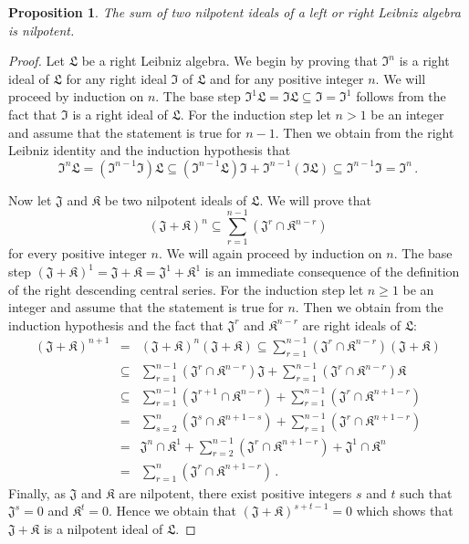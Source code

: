 \documentclass{amsart}
\newtheorem{pro}[thm]{Proposition}
\numberwithin{equation}{section}
\newcommand{\lf}{\mathfrak{L}}
\newcommand{\If}{\mathfrak{I}}
\newcommand{\jf}{\mathfrak{J}}
\newcommand{\kf}{\mathfrak{K}}
\begin{document}
\begin{pro}\label{sumidnilp}
The sum of two nilpotent ideals of a left or right Leibniz algebra is nilpotent.
\end{pro}

\begin{proof}
Let $\lf$ be a right Leibniz algebra. We begin by proving that $\If^n$ is a right ideal of $\lf$ for
any right ideal $\If$ of $\lf$ and for any positive integer $n$. We will proceed by induction on
$n$. The base step $\If^1\lf=\If\lf\subseteq\If=\If^1$ follows from the fact that $\If$ is a
right ideal of $\lf$. For the induction step let $n>1$ be an integer and assume that the statement
is true for $n-1$. Then we obtain from the right Leibniz identity and the induction hypothesis that
$$\If^n\lf=(\If^{n-1}\If)\lf\subseteq(\If^{n-1}\lf)\If+\If^{n-1}(\If\lf)\subseteq\If^{n-1}\If=
\If^n\,.$$

Now let $\jf$ and $\kf$ be two nilpotent ideals of $\lf$. We will prove that $$(\jf+\kf)^n\subseteq
\sum_{r=1}^{n-1}(\jf^r\cap\kf^{n-r})$$ for every positive integer $n$. We will again proceed by
induction on $n$. The base step $(\jf+\kf)^1=\jf+\kf=\jf^1+\kf^1$ is an immediate consequence
of the definition of the right descending central series. For the induction step let $n\ge 1$ be an integer
and assume that the statement is true for $n$. Then we obtain from the induction hypothesis and
the fact that $\jf^r$ and $\kf^{n-r}$ are right ideals of $\lf$:
\begin{eqnarray*}
(\jf+\kf)^{n+1} & = & (\jf+\kf)^n(\jf+\kf)\subseteq\sum_{r=1}^{n-1}(\jf^r\cap\kf^{n-r})(\jf+\kf)\\
& \subseteq & \sum_{r=1}^{n-1}(\jf^r\cap\kf^{n-r})\jf+\sum_{r=1}^{n-1}(\jf^r\cap\kf^{n-r})\kf\\
& \subseteq & \sum_{r=1}^{n-1}(\jf^{r+1}\cap\kf^{n-r})+\sum_{r=1}^{n-1}(\jf^r\cap\kf^{n+1-r})\\
& = & \sum_{s=2}^n(\jf^s\cap\kf^{n+1-s})+\sum_{r=1}^{n-1}(\jf^r\cap\kf^{n+1-r})\\
& = & \jf^n\cap\kf^1+\sum_{r=2}^{n-1}(\jf^r\cap\kf^{n+1-r})+\jf^1\cap\kf^n\\
& = & \sum_{r=1}^n(\jf^r\cap\kf^{n+1-r})\,.
\end{eqnarray*}
Finally, as $\jf$ and $\kf$ are nilpotent, there exist positive integers $s$ and $t$ such that $\jf^s
=0$ and $\kf^t=0$. Hence we obtain that $(\jf+\kf)^{s+t-1}=0$ which shows that $\jf+\kf$
is a nilpotent ideal of $\lf$.
\end{proof}
\end{document}
